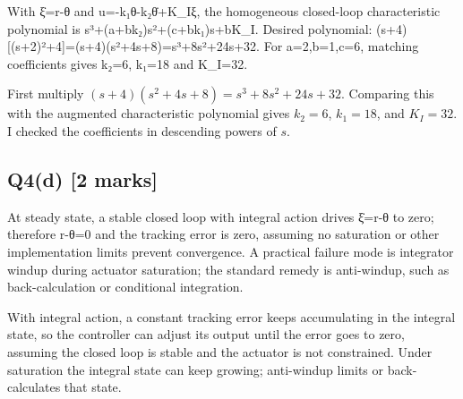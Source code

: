 \documentclass[11pt,a4paper]{article}
\begin{document}
With ξ̇=r-θ and u=-k₁θ-k₂θ̇+K\_Iξ, the homogeneous closed-loop characteristic polynomial is s³+(a+bk₂)s²+(c+bk₁)s+bK\_I.
Desired polynomial: (s+4)[(s+2)²+4]=(s+4)(s²+4s+8)=s³+8s²+24s+32.
For a=2,b=1,c=6, matching coefficients gives k₂=6, k₁=18 and K\_I=32.\par\smallskip First multiply $(s+4)(s^2+4s+8)=s^3+8s^2+24s+32$. Comparing this with the augmented characteristic polynomial gives $k_2=6$, $k_1=18$, and $K_I=32$. I checked the coefficients in descending powers of $s$.

\subsection*{Q4(d) \hfill [2 marks]}

At steady state, a stable closed loop with integral action drives ξ̇=r-θ to zero; therefore r-θ=0 and the tracking error is zero, assuming no saturation or other implementation limits prevent convergence.
A practical failure mode is integrator windup during actuator saturation; the standard remedy is anti-windup, such as back-calculation or conditional integration.\par\smallskip With integral action, a constant tracking error keeps accumulating in the integral state, so the controller can adjust its output until the error goes to zero, assuming the closed loop is stable and the actuator is not constrained. Under saturation the integral state can keep growing; anti-windup limits or back-calculates that state.
\end{document}
